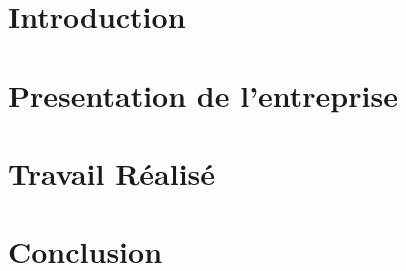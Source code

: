 \documentclass[a4paper, 12pt]{report}
\begin{document}
\begin{large}
\thispagestyle{empty}
\tableofcontents
\end{large}
\setcounter{page}{0}
\part{Introduction}




\part{Presentation de l'entreprise}


\part{Travail Réalisé}


\part{Conclusion}

\end{document}
